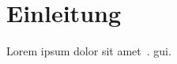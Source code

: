 
\section{Einleitung} \label{sec:01-introduction}

Lorem ipsum dolor sit amet~. \gls{gui}.

\clearpage
